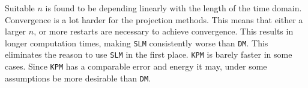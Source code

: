 \noindent Suitable $n$ is found to be depending linearly with the length of the time domain.\\

\noindent Convergence is a lot harder for the projection methods. This means that either a larger $n$, or more restarts are necessary to achieve convergence. This results in longer computation times,
making \texttt{SLM} consistently worse than \texttt{DM}. This eliminates the reason to use \texttt{SLM} in the first place. \texttt{KPM} is barely faster in some cases. Since \texttt{KPM} has a comparable error and energy it may, under some assumptions be more desirable than \texttt{DM}.
